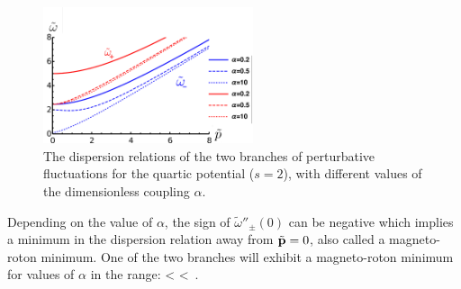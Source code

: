 \begin{figure}[H]
\begin{center}
    \includegraphics[width=0.55\textwidth]{Chapter_2_Folder_1912.11321/figures/Dispersion_relations-2.pdf}    
    \caption[\textcolor{red}{Dispersion relations for the Abelian Chern-Simons theory in the symmetry broken phase.}]{{\small The dispersion relations of the two branches of perturbative fluctuations for the quartic potential ($s=2$), with different values of the dimensionless coupling $\alpha$.}} \label{fig:dispersion}
    \end{center}
\end{figure}
Depending on the value of $\alpha$, the sign of  $\tilde\omega''_{\pm}(0)$ can be negative which implies a minimum in the dispersion relation away from $\tilde{\bf p}=0$, also called a magneto-roton minimum. One  of the two branches  will exhibit a magneto-roton minimum  for values of $\alpha$ in the range:
\be
\quad{} < \alpha <  \,.
\ee

